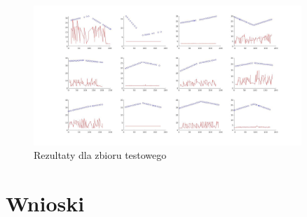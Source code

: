 \documentclass{article}
\begin{document}
\begin{figure}
\centering
	\includegraphics[width=0.90\textwidth]{fig2.jpg}\par\vspace{1cm}
\caption{Rezultaty dla zbioru testowego}
	\label{fig:features}
\end{figure}

\section{Wnioski}
\end{document}
